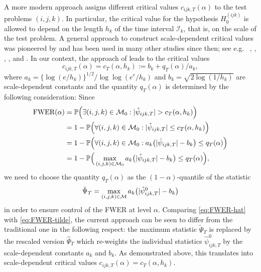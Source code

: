 \documentclass[a4paper,12pt]{article}
\numberwithin{equation}{section}
\begin{document}
A more modern approach assigns different critical values $c_{ijk,T}(\alpha)$ to the test problems $(i,j,k)$. In particular, the critical value for the hypothesis $H_0^{(ijk)}$ is allowed to depend on the length $h_k$ of the time interval $\mathcal{I}_k$, that is, on the scale of the test problem. A general approach to construct scale-dependent critical values was pioneered by \cite{DuembgenSpokoiny2001} and has been used in many other studies since then; {\color{red}see e.g.\ } \cite{Rohde2008}, \cite{DuembgenWalther2008}, \cite{RufibachWalther2010}, \cite{SchmidtHieber2013}, \cite{EckleBissantzDette2017} and \cite{Dunker2019}. In our context, the approach of \cite{DuembgenSpokoiny2001} leads to the critical values 
\begin{equation*}
c_{ijk,T}(\alpha) = c_T(\alpha,h_k) := b_k + q_T(\alpha)/a_k, 
\end{equation*}
where $a_k = \{\log(e/h_k)\}^{1/2} / \log \log(e^e / h_k)$ and $b_k = \sqrt{2 \log(1/h_k)}$ are scale-dependent constants and the quantity $q_T(\alpha)$ is determined by the following consideration: Since 
\begin{align}
\text{FWER}(\alpha)
  & = \mathbb{P} \Big( \exists (i,j,k) \in \mathcal{M}_0: |\hat{\psi}_{ijk,T}| > c_T(\alpha,h_k) \Big) \nonumber \\
 & =  1 - \mathbb{P} \Big( \forall (i,j,k) \in \mathcal{M}_0: |\hat{\psi}_{ijk,T}| \le c_T(\alpha,h_k) \Big) \nonumber \\
 & =  1 - \mathbb{P} \Big( \forall (i,j,k) \in \mathcal{M}_0: a_k \big(|\hat{\psi}_{ijk,T}| - b_k\big) \le q_T(\alpha) \Big) \nonumber \\
 & = 1 - \mathbb{P}\Big( \max_{(i,j,k) \in \mathcal{M}_0} a_k \big( |\hat{\psi}_{ijk,T}| - b_k \big) \le q_T(\alpha) \Big), \label{eq:FWER-hat}
\end{align}
we need to choose the quantity $q_T(\alpha)$ as the $(1-\alpha)$-quantile of the statistic 
\[ \hat{\Psi}_T = \max_{(i,j,k) \in \mathcal{M}} a_k \big( |\hat{\psi}_{ijk,T}^0| - b_k \big) \]
in order to ensure control of the FWER at level $\alpha$. Comparing \eqref{eq:FWER-hat} with \eqref{eq:FWER-tilde}, the current approach can be seen to differ from the traditional one in the following respect: the maximum statistic $\tilde{\Psi}_T$ is replaced by the rescaled version $\hat{\Psi}_T$ which re-weights the individual statistics $\hat{\psi}_{ijk,T}^0$ by the scale-dependent constants $a_k$ and $b_k$. As demonstrated above, this translates into scale-dependent critical values $c_{ijk,T}(\alpha) = c_T(\alpha,h_k)$. 
\end{document}
